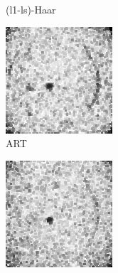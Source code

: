 \documentclass[journal]{IEEEtran}
\begin{document}
\begin{figure}[!h]
\begin{subfigure}[b]{0.24\linewidth}
        \caption{(l1-ls)-Haar}
     \end{subfigure}
    \begin{subfigure}[b]{0.24\linewidth}
        \includegraphics[width=\textwidth]{../images/potato/2D/weightsIm_art30.png}
        \caption{ART}
     \end{subfigure}
    \begin{subfigure}[b]{0.24\linewidth}
        \includegraphics[width=\textwidth]{../images/potato/2D/weightsIm_sart30.png}

\end{subfigure}
\end{figure}
\end{document}
